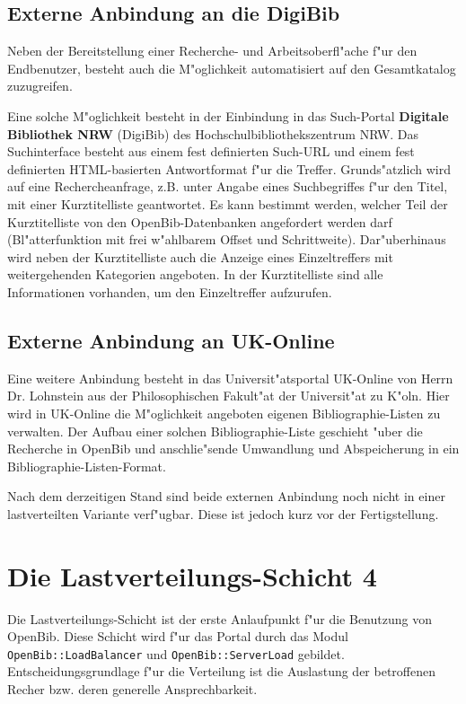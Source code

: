 \documentclass[11pt, twoside, a4paper, BCOR8mm, DIV12, bibtotoc,idxtotoc]{scrbook}
\begin{document}
\subsection{Externe Anbindung an die DigiBib}

Neben der Bereitstellung einer Recherche- und Arbeitsoberfl"ache f"ur
den Endbenutzer, besteht auch die M"oglichkeit automatisiert auf den
Gesamtkatalog zuzugreifen.

Eine solche M"oglichkeit besteht in der Einbindung in das Such-Portal
\textbf{Digitale Bibliothek NRW} (DigiBib) des
Hoch\-schul\-bibliotheks\-zentrum NRW. Das Suchinterface besteht aus
einem fest definierten Such-URL und einem fest definierten
HTML-basierten Antwortformat f"ur die Treffer. Grunds"atzlich wird auf
eine Rechercheanfrage, z.B. unter Angabe eines Suchbegriffes f"ur den
Titel, mit einer Kurztitelliste geantwortet. Es kann bestimmt werden,
welcher Teil der Kurztitelliste von den OpenBib-Daten\-banken
angefordert werden darf (Bl"atterfunktion mit frei w"ahlbarem Offset
und Schrittweite). Dar"uberhinaus wird neben der Kurztitelliste auch
die Anzeige eines Einzeltreffers mit weiter\-gehen\-den Kategorien
angeboten. In der Kurztitelliste sind alle Informationen vorhanden, um
den Einzeltreffer aufzurufen.

\subsection{Externe Anbindung an UK-Online}

Eine weitere Anbindung besteht in das Universit"atsportal UK-Online
von Herrn Dr. Lohnstein aus der Philosophischen Fakult"at der
Universit"at zu K"oln. Hier wird in UK-Online die M"oglichkeit
angeboten eigenen Bibliographie-Listen zu verwalten. Der Aufbau einer
solchen Bibliographie-Liste geschieht "uber die Recherche in OpenBib
und anschlie"sende Umwandlung und Ab\-spei\-cherung in ein
Bibliographie-Listen-Format.

Nach dem derzeitigen Stand sind beide externen Anbindung noch nicht in
einer lastverteilten Variante verf"ugbar. Diese ist jedoch kurz vor
der Fertigstellung.

\section{Die Lastverteilungs-Schicht 4}

Die Lastverteilungs-Schicht ist der erste Anlaufpunkt f"ur die
Benutzung von OpenBib. Diese Schicht wird f"ur das Portal durch das
Modul \texttt{OpenBib::LoadBalancer} und \texttt{OpenBib::ServerLoad} gebildet.
Entscheidungsgrundlage f"ur die Verteilung ist die Auslastung der
betroffenen Recher bzw. deren generelle Ansprechbarkeit.
\end{document}
